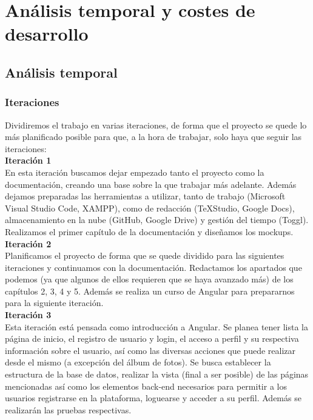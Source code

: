 \chapter{An\'alisis temporal y costes de desarrollo}\label{anatemporal}
\section{An\'alisis temporal}
\subsection{Iteraciones}

Dividiremos el trabajo en varias iteraciones, de forma que el proyecto se quede lo más planificado posible para que, a la hora de trabajar, solo haya que seguir las iteraciones:\\

\textbf{Iteración 1}\\

En esta iteración buscamos dejar empezado tanto el proyecto como la documentación, creando una base sobre la que trabajar más adelante. Además dejamos preparadas las herramientas a utilizar, tanto de trabajo (Microsoft Visual Studio Code, XAMPP), como de redacción (TeXStudio, Google Docs), almacenamiento en la nube (GitHub, Google Drive) y gestión del tiempo (Toggl). Realizamos el primer capítulo de la documentación y diseñamos los mockups.\\

\textbf{Iteración 2}\\

Planificamos el proyecto de forma que se quede dividido para las siguientes iteraciones y continuamos con la documentación. Redactamos los apartados que podemos (ya que algunos de ellos requieren que se haya avanzado más) de los capítulos 2, 3, 4 y 5. Además se realiza un curso de Angular para prepararnos para la siguiente iteración.\\

\textbf{Iteración 3}\\

Esta iteración está pensada como introducción a Angular. Se planea tener lista la página de inicio, el registro de usuario y login, el acceso a perfil y su respectiva información sobre el usuario, así como las diversas acciones que puede realizar desde el mismo (a excepción del álbum de fotos). Se busca establecer la estructura de la base de datos, realizar la vista (final a ser posible) de las páginas mencionadas así como los elementos back-end necesarios para permitir a los usuarios registrarse en la plataforma, loguearse y acceder a su perfil. Además se realizarán las pruebas respectivas.\\

